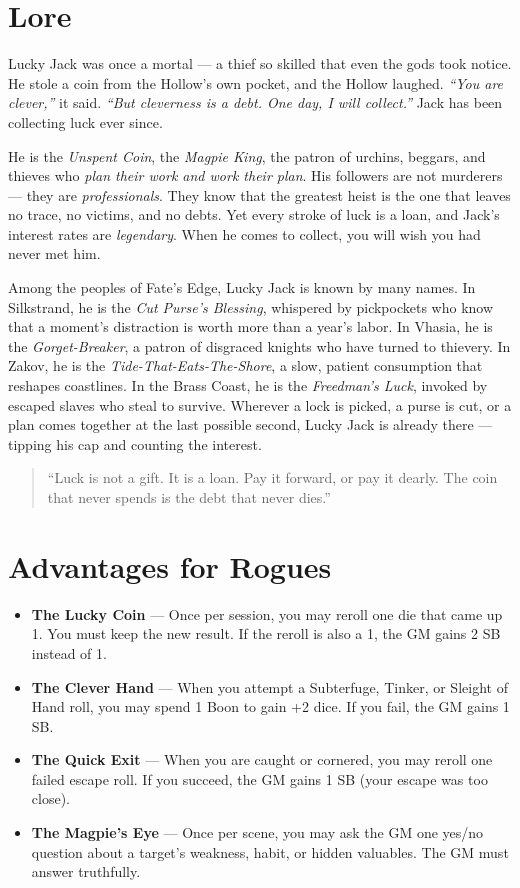 \documentclass[10pt,twoside]{book}
\begin{document}
\section{Lore}
Lucky Jack was once a mortal --- a thief so skilled that even the gods took notice. He stole a coin from the Hollow's own pocket, and the Hollow laughed. \textit{``You are clever,''} it said. \textit{``But cleverness is a debt. One day, I will collect.''} Jack has been collecting luck ever since.

He is the \textit{Unspent Coin}, the \textit{Magpie King}, the patron of urchins, beggars, and thieves who \textit{plan their work and work their plan}. His followers are not murderers --- they are \textit{professionals}. They know that the greatest heist is the one that leaves no trace, no victims, and no debts. Yet every stroke of luck is a loan, and Jack's interest rates are \textit{legendary}. When he comes to collect, you will wish you had never met him.

Among the peoples of Fate's Edge, Lucky Jack is known by many names. In Silkstrand, he is the \textit{Cut Purse's Blessing}, whispered by pickpockets who know that a moment's distraction is worth more than a year's labor. In Vhasia, he is the \textit{Gorget-Breaker}, a patron of disgraced knights who have turned to thievery. In Zakov, he is the \textit{Tide-That-Eats-The-Shore}, a slow, patient consumption that reshapes coastlines. In the Brass Coast, he is the \textit{Freedman's Luck}, invoked by escaped slaves who steal to survive. Wherever a lock is picked, a purse is cut, or a plan comes together at the last possible second, Lucky Jack is already there --- tipping his cap and counting the interest.

\begin{quote}
``Luck is not a gift. It is a loan. Pay it forward, or pay it dearly. The coin that never spends is the debt that never dies.''
\end{quote}

\section{Advantages for Rogues}
\begin{itemize}
\item \textbf{The Lucky Coin} --- Once per session, you may reroll one die that came up 1. You must keep the new result. If the reroll is also a 1, the GM gains 2 SB instead of 1.
\item \textbf{The Clever Hand} --- When you attempt a Subterfuge, Tinker, or Sleight of Hand roll, you may spend 1 Boon to gain +2 dice. If you fail, the GM gains 1 SB.
\item \textbf{The Quick Exit} --- When you are caught or cornered, you may reroll one failed escape roll. If you succeed, the GM gains 1 SB (your escape was too close).
\item \textbf{The Magpie's Eye} --- Once per scene, you may ask the GM one yes/no question about a target's weakness, habit, or hidden valuables. The GM must answer truthfully.
\end{itemize}
\end{document}
